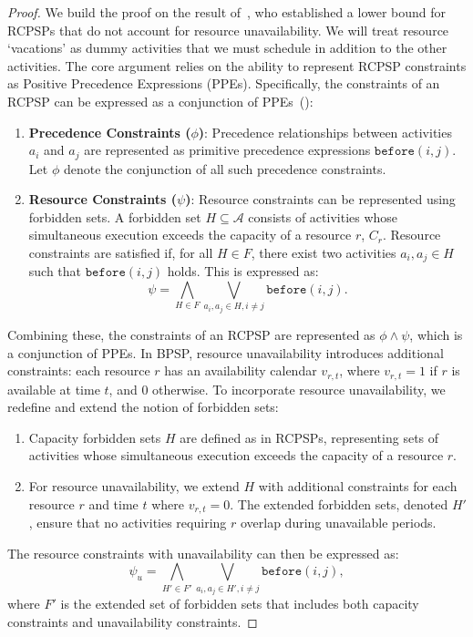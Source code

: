\begin{proof}
We build the proof on the result of~\cite{beck2007proactive}, who established a lower bound for RCPSPs that do not account for resource unavailability. We will treat resource `vacations'
as dummy activities that we must schedule in addition to the other activities. The core argument relies on the ability to represent RCPSP constraints as Positive Precedence Expressions (PPEs).
Specifically, the constraints of an RCPSP can be expressed as a conjunction of PPEs~(\cite{beck2007proactive}):
\begin{enumerate}
    \item \textbf{Precedence Constraints (\( \phi \))}: Precedence relationships between activities \( a_i \) and \( a_j \) are represented as primitive precedence expressions \( \texttt{before}(i, j) \). Let \( \phi \) denote the conjunction of all such precedence constraints.

    \item \textbf{Resource Constraints (\( \psi \))}: Resource constraints can be represented using forbidden sets. A forbidden set \( H \subseteq \mathcal{A} \) consists of activities whose simultaneous execution exceeds the capacity of a resource \( r \), $C_r$. Resource constraints are satisfied if, for all \( H \in F \), there exist two activities \( a_i, a_j \in H \) such that \( \texttt{before}(i, j) \) holds. This is expressed as:
    \[
    \psi = \bigwedge_{H \in F} \bigvee_{a_i, a_j \in H, i \neq j} \texttt{before}(i, j).
    \]
\end{enumerate} Combining these, the constraints of an RCPSP are represented as \( \phi \wedge \psi \), which is a conjunction of PPEs. In BPSP, resource unavailability introduces additional constraints:
each resource \( r \) has an availability calendar \( v_{r,t} \), where \( v_{r,t} = 1 \) if \( r \) is available at time \( t \), and \( 0 \) otherwise.
To incorporate resource unavailability, we redefine and extend the notion of forbidden sets:
\begin{enumerate}
    \item Capacity forbidden sets \( H \) are defined as in RCPSPs, representing sets of activities whose simultaneous execution exceeds the capacity of a resource \( r \).
    \item For resource unavailability, we extend \(H\) with additional constraints for each resource \( r \) and time \( t \) where \( v_{r,t} = 0 \). The extended forbidden sets, denoted $H'$, ensure that no activities requiring \( r \) overlap during unavailable periods.
\end{enumerate} The resource constraints with unavailability can then be expressed as:
\[
\psi_u = \bigwedge_{H' \in F'} \bigvee_{a_i, a_j \in H', i \neq j} \texttt{before}(i, j),
\]
where \( F' \) is the extended set of forbidden sets that includes both capacity constraints and unavailability constraints.


\end{proof}
